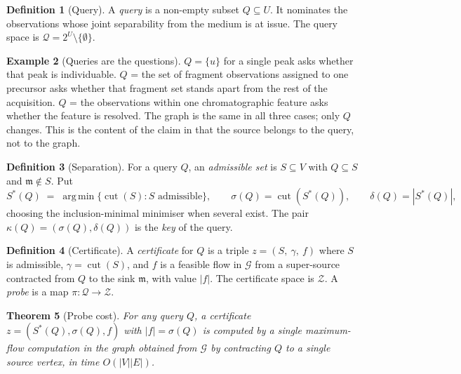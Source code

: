 \documentclass[11pt,a4paper]{article}
\newtheorem{theorem}{Theorem}[section]
\theoremstyle{definition}
\newtheorem{definition}[theorem]{Definition}
\newtheorem{example}[theorem]{Example}
\theoremstyle{remark}
\newcommand{\Gph}{\mathcal{G}}
\newcommand{\med}{\mathfrak{m}}
\newcommand{\cut}{\operatorname{cut}}
\newcommand{\sep}{\sigma}
\newcommand{\dep}{\delta}
\newcommand{\key}{\kappa}
\newcommand{\Qry}{\mathcal{Q}}               %
\newcommand{\Cert}{\mathcal{Z}}              %
\newcommand{\prb}{\pi}                       %
\DeclareMathOperator*{\argmin}{arg\,min}
\begin{document}
\begin{definition}[Query]\label{def:query}
A \emph{query} is a non-empty subset $Q \subseteq U$. It nominates the
observations whose joint separability from the medium is at issue. The
query space is $\Qry = 2^{U} \setminus \{\emptyset\}$.
\end{definition}

\begin{example}[Queries are the questions]\label{ex:queries}
$Q = \{u\}$ for a single peak asks whether that peak is individuable.
$Q$ = the set of fragment observations assigned to one precursor asks
whether that fragment set stands apart from the rest of the acquisition.
$Q$ = the observations within one chromatographic feature asks whether
the feature is resolved. The graph is the same in all three cases; only
$Q$ changes. This is the content of the claim in  that
the source belongs to the query, not to the graph.
\end{example}

\begin{definition}[Separation]\label{def:sep}
For a query $Q$, an \emph{admissible set} is $S \subseteq V$ with
$Q \subseteq S$ and $\med \notin S$. Put
\[
S^{\ast}(Q) \;=\; \argmin\{\cut(S) : S \text{ admissible}\},
\qquad
\sep(Q) = \cut(S^{\ast}(Q)),
\qquad
\dep(Q) = |S^{\ast}(Q)|,
\]
choosing the inclusion-minimal minimiser when several exist. The pair
$\key(Q) = (\sep(Q),\dep(Q))$ is the \emph{key} of the query.
\end{definition}

\begin{definition}[Certificate]\label{def:certificate}
A \emph{certificate} for $Q$ is a triple $z = (S,\ \gamma,\ f)$ where
$S$ is admissible, $\gamma = \cut(S)$, and $f$ is a feasible flow in
$\Gph$ from a super-source contracted from $Q$ to the sink $\med$, with
value $|f|$. The certificate space is $\Cert$. A \emph{probe} is a map
$\prb : \Qry \to \Cert$.
\end{definition}

\begin{theorem}[Probe cost]\label{thm:probe-cost}
For any query $Q$, a certificate $z = (S^{\ast}(Q),\sep(Q),f)$ with
$|f| = \sep(Q)$ is computed by a single maximum-flow computation in the
graph obtained from $\Gph$ by contracting $Q$ to a single source vertex,
in time $O(|V||E|)$.
\end{theorem}
\end{document}
